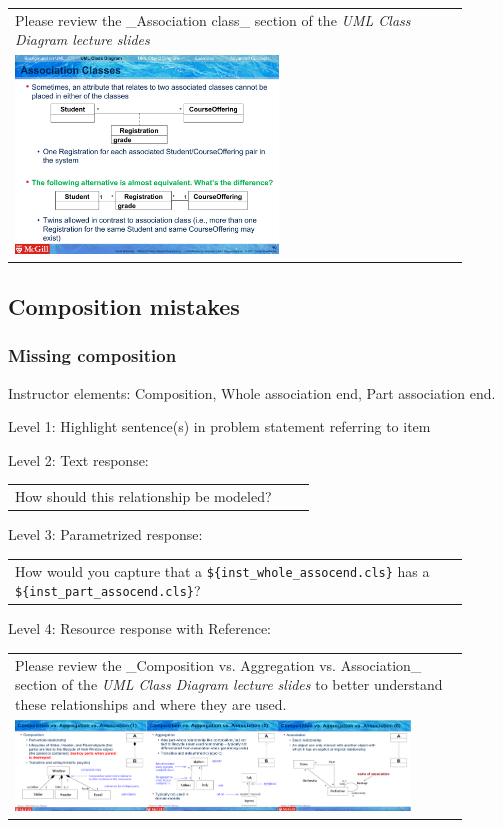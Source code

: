 \begin{tabular}{|p{0.9\linewidth}}
Please review the _Association class_ section of the
\textit{UML Class Diagram lecture slides}

\\
\includegraphics[width=0.6\textwidth]{images/association_class.png}
\end{tabular} \medskip


\subsection{Composition mistakes}

\subsubsection{Missing composition}

Instructor elements: Composition, Whole association end, Part association end. \medskip

\noindent Level 1: Highlight sentence(s) in problem statement referring to item \medskip

\noindent Level 2: Text response: \medskip

\begin{tabular}{|p{0.9\linewidth}}
How should this relationship be modeled?
\end{tabular} \medskip

\noindent Level 3: Parametrized response: \medskip

\begin{tabular}{|p{0.9\linewidth}}
How would you capture that a \verb|${inst_whole_assocend.cls}| has a \verb|${inst_part_assocend.cls}|?
\end{tabular} \medskip

\noindent Level 4: Resource response with Reference: \medskip

\begin{tabular}{|p{0.9\linewidth}}
Please review the _Composition vs. Aggregation vs. Association_ section of 
the \textit{UML Class Diagram lecture slides} to 
better understand these relationships and where they are used.

\\
\includegraphics[width=0.9\textwidth]{images/composition_aggregation_association.png}
\end{tabular} \medskip



